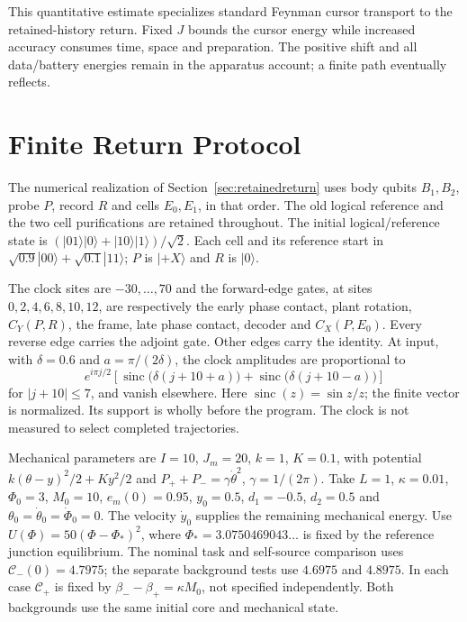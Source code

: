 \documentclass[12pt]{article}
\theoremstyle{definition}
\theoremstyle{remark}
\begin{document}
This quantitative estimate specializes standard Feynman cursor
transport to the retained-history return. Fixed $J$ bounds the
cursor energy while increased accuracy consumes time, space and
preparation. The positive shift and all data/battery energies remain
in the apparatus account; a finite path eventually reflects.

\section{Finite Return Protocol}\label{app:physicalreturn}

The numerical realization of Section~\ref{sec:retainedreturn} uses body
qubits $B_1,B_2$, probe $P$, record $R$ and cells $E_0,E_1$, in that
order. The old logical reference and the two cell purifications are
retained throughout. The initial logical/reference state is
$(|01\rangle|0\rangle+|10\rangle|1\rangle)/\sqrt2$.
Each cell and its reference start in
$\sqrt{0.9}|00\rangle+\sqrt{0.1}|11\rangle$; $P$ is $|+X\rangle$
and $R$ is $|0\rangle$.

The clock sites are $-30,\ldots,70$ and the forward-edge gates, at
sites $0,2,4,6,8,10,12$, are respectively the early phase contact,
plant rotation, $C_Y(P,R)$, the frame, late phase contact, decoder
and $C_X(P,E_0)$. Every reverse edge carries the adjoint gate.
Other edges carry the identity. At input, with $\delta=0.6$ and
$a=\pi/(2\delta)$, the clock amplitudes are proportional to
\[
 e^{i\pi j/2}\left[
 \operatorname{sinc}\bigl(\delta(j+10+a)\bigr)+
 \operatorname{sinc}\bigl(\delta(j+10-a)\bigr)\right]
\]
for $|j+10|\le7$, and vanish elsewhere. Here
$\operatorname{sinc}(z)=\sin z/z$; the finite vector is normalized.
Its support is wholly before the program. The clock is not measured
to select completed trajectories.

Mechanical parameters are $I=10$, $J_m=20$, $k=1$, $K=0.1$,
with potential $k(\theta-y)^2/2+Ky^2/2$ and
$P_++P_-=\gamma\dot\theta^2$, $\gamma=1/(2\pi)$.
Take $L=1$, $\kappa=0.01$, $\Phi_0=3$, $M_0=10$,
$e_m(0)=0.95$, $y_0=0.5$, $d_1=-0.5$, $d_2=0.5$ and
$\theta_0=\dot\theta_0=\dot\Phi_0=0$.
The velocity $\dot y_0$ supplies the remaining mechanical energy.
Use $U(\Phi)=50(\Phi-\Phi_*)^2$, where
$\Phi_*=3.0750469043\ldots$ is fixed by the reference junction
equilibrium. The nominal task and self-source comparison uses
$\mathcal C_-(0)=4.7975$; the separate background tests use
$4.6975$ and $4.8975$.
In each case $\mathcal C_+$ is fixed by
$\beta_--\beta_+=\kappa M_0$, not specified independently.
Both backgrounds use the same initial core and mechanical state.
\end{document}
